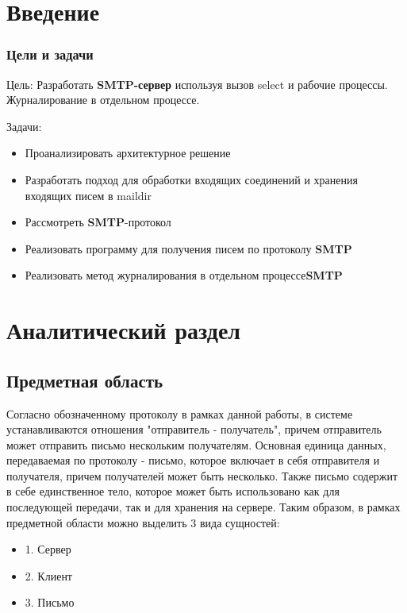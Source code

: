 \documentclass[a4paper,12pt]{report}
\begin{document}
\tableofcontents
\setcounter{page}{3} %
\chapter*{Введение}
\subsection{Цели и задачи}

Цель: 
    Разработать \textbf{SMTP-сервер} используя вызов select и рабочие процессы. Журналирование
    в отдельном процессе.

Задачи:
\begin{itemize}
    \item Проанализировать архитектурное решение
    \item Разработать подход для обработки входящих соединений и хранения входящих писем в maildir
    \item Рассмотреть \textbf{SMTP}-протокол
    \item Реализовать программу для получения писем по протоколу \textbf{SMTP}
    \item Реализовать метод журналирования в отдельном процессе\textbf{SMTP}
\end{itemize}

\chapter{Аналитический раздел}

\section*{Предметная область}
Согласно обозначенному протоколу в рамках данной работы, в системе устанавливаются отношения "отправитель - получатель", причем отправитель может отправить письмо нескольким получателям. Основная единица данных, передаваемая по протоколу - письмо, которое включает в себя отправителя и получателя, причем получателей может быть несколько. Также письмо содержит в себе единственное тело, которое может быть использовано как для последующей передачи, так и для хранения на сервере.
Таким образом, в рамках предметной области можно выделить 3 вида сущностей:
\begin{itemize}
    \item 1. Сервер
    \item 2. Клиент
    \item 3. Письмо
\end{itemize}
\end{document}

